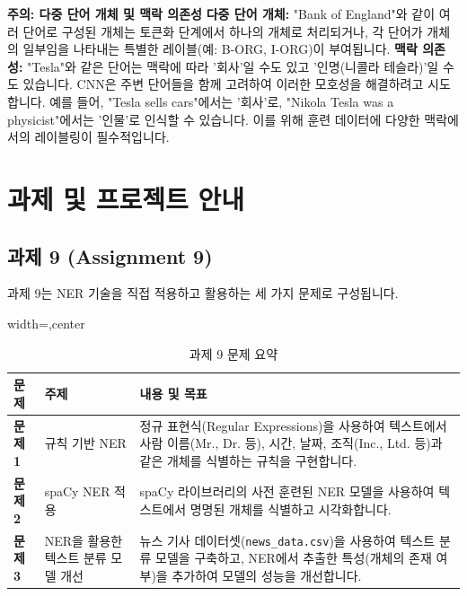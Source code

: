 \documentclass[11pt,a4paper]{article}
\theoremstyle{definition}
\begin{document}
\begin{warningbox}
\textbf{주의: 다중 단어 개체 및 맥락 의존성}
\textbf{다중 단어 개체:} "Bank of England"와 같이 여러 단어로 구성된 개체는 토큰화 단계에서 하나의 개체로 처리되거나, 각 단어가 개체의 일부임을 나타내는 특별한 레이블(예: B-ORG, I-ORG)이 부여됩니다.
\textbf{맥락 의존성:} "Tesla"와 같은 단어는 맥락에 따라 '회사'일 수도 있고 '인명(니콜라 테슬라)'일 수도 있습니다. CNN은 주변 단어들을 함께 고려하여 이러한 모호성을 해결하려고 시도합니다. 예를 들어, "Tesla sells cars"에서는 '회사'로, "Nikola Tesla was a physicist"에서는 '인물'로 인식할 수 있습니다. 이를 위해 훈련 데이터에 다양한 맥락에서의 레이블링이 필수적입니다.
\end{warningbox}

\newpage
\section{과제 및 프로젝트 안내}

\subsection{과제 9 (Assignment 9)}
과제 9는 NER 기술을 직접 적용하고 활용하는 세 가지 문제로 구성됩니다.

\begin{table}[h!]
\caption{과제 9 문제 요약}
\label{tab:assignment9_summary}
\centering
\begin{adjustbox}{width=\textwidth,center}
\begin{tabular}{p{}p{}p{}}
\toprule
\textbf{문제} & \textbf{주제} & \textbf{내용 및 목표} \\
\midrule
\textbf{문제 1} & 규칙 기반 NER & 정규 표현식(Regular Expressions)을 사용하여 텍스트에서 사람 이름(Mr., Dr. 등), 시간, 날짜, 조직(Inc., Ltd. 등)과 같은 개체를 식별하는 규칙을 구현합니다. \\
\textbf{문제 2} & spaCy NER 적용 & spaCy 라이브러리의 사전 훈련된 NER 모델을 사용하여 텍스트에서 명명된 개체를 식별하고 시각화합니다. \\
\textbf{문제 3} & NER을 활용한 텍스트 분류 모델 개선 & 뉴스 기사 데이터셋(\texttt{news\_data.csv})을 사용하여 텍스트 분류 모델을 구축하고, NER에서 추출한 특성(개체의 존재 여부)을 추가하여 모델의 성능을 개선합니다. \\
\bottomrule
\end{tabular}
\end{adjustbox}
\end{table}
\end{document}
